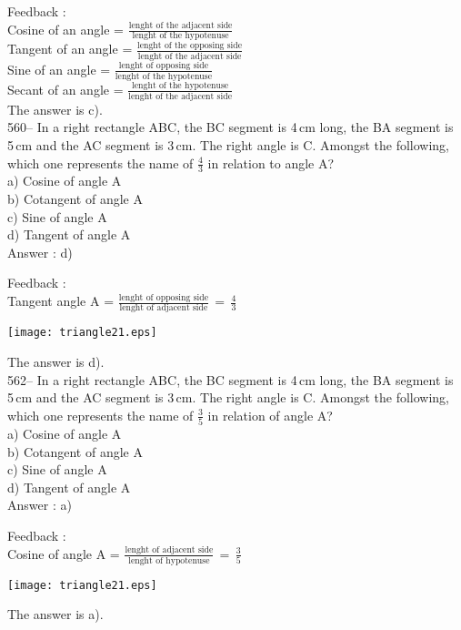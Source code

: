 \documentclass[letterpaper, 12pt]{article}
\begin{document}
Feedback : \\
Cosine of an angle = $\frac{\textrm{lenght of the adjacent side}}{\textrm{lenght of the hypotenuse}}$\\[2mm]
Tangent of an angle = $\frac{\textrm{lenght of the opposing side}}{\textrm{lenght of the adjacent side}}$\\[2mm]
Sine of an angle = $\frac{\textrm{lenght of opposing side}}{\textrm{lenght of the hypotenuse}}$\\[2mm]
Secant of an angle =  $\frac{\textrm{lenght of the hypotenuse}}{\textrm{lenght of the adjacent side}}$\\[2mm]
The answer is c).\\

560-- In a right rectangle ABC, the BC segment is 4\,cm long, the BA segment is 5\,cm and the AC segment is 3\,cm. The right angle is C. Amongst the following, which one represents the name of $\frac{4}{3}$ in relation to angle A?\\
a) Cosine of angle A\\
b) Cotangent of angle A\\
c) Sine of angle A\\
d) Tangent of angle A\\

Answer : d)

Feedback : \\
Tangent angle A = $\frac{\textrm{lenght of opposing side}}{\textrm{lenght of adjacent side}}\,=\,\frac{\textrm{4}}{\textrm{3}}$\\
    \begin{center}
    \texttt{[image: triangle21.eps]}
    \end{center}

The answer is d).\\


562-- In a right rectangle ABC, the BC segment is 4\,cm long, the BA segment is 5\,cm and the AC segment is 3\,cm. The right angle is C. Amongst the following, which one represents the name of $\frac{3}{5}$ in relation of angle A?\\
a) Cosine of angle A\\
b) Cotangent of angle A\\
c) Sine of angle A\\
d) Tangent of angle A\\

Answer : a)

Feedback : \\
Cosine of angle A = $\frac{\textrm{lenght of adjacent side}}{\textrm{lenght of hypotenuse}}\,=\,\frac{\textrm{3}}{\textrm{5}}$\\
\begin{center}
    \texttt{[image: triangle21.eps]}
    \end{center}
The answer is a).\\
\end{document}
